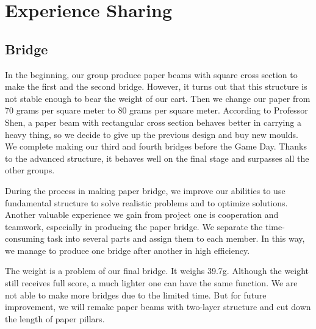 \section{Experience Sharing}

\subsection{Bridge}
In the beginning, our group produce paper beams with square cross section to make the first and the second bridge. However, it turns out that this structure is not stable enough to bear the weight of our cart. Then we change our paper from 70 grams per square meter to 80 grams per square meter. According to Professor Shen, a paper beam with rectangular cross section behaves better in carrying a heavy thing, so we decide to give up the previous design and buy new moulds. We complete making our third and fourth bridges before the Game Day. Thanks to the advanced structure, it behaves well on the final stage and surpasses all the other groups.
\par
During the process in making paper bridge, we improve our abilities to use fundamental structure to solve realistic problems and to optimize solutions. Another valuable experience we gain from project one is cooperation and teamwork, especially in producing the paper bridge. We separate the time-consuming task into several parts and assign them to each member. In this way, we manage to produce one bridge after another in high efficiency.
\par
The weight is a problem of our final bridge. It weighs 39.7g. Although the weight still receives full score, a much lighter one can have the same function. We are not able to make more bridges due to the limited time. But for future improvement, we will remake paper beams with two-layer structure and cut down the length of paper pillars.

\newpage


